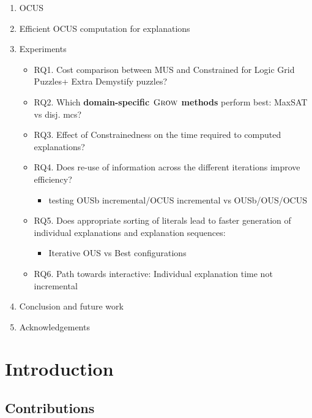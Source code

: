 \documentclass[twoside,11pt]{article}
\newcommand\mm[1]{\ensuremath{#1}\xspace}
\newcommand\call[1]{\mm{\textsc{#1}}}
\newcommand\grow{\mm{\call{Grow}}}
\begin{document}
\begin{enumerate}
\begin{itemize}
		  \item Calls to OCUS very similar (incrementality/better search)	
	  \end{itemize}
\item OCUS
\item Efficient OCUS computation for explanations
\item Experiments
	  \begin{itemize}
		  \item RQ1. Cost comparison between MUS and Constrained for Logic Grid Puzzles+ Extra Demystify puzzles?
		  \item RQ2. Which \textbf{domain-specific \grow methods} perform best: MaxSAT vs disj. mcs?
		  \item RQ3. Effect of Constrainedness on the time required to computed explanations?
		  \item RQ4. Does re-use of information across the different iterations improve efficiency? 
				\begin{itemize}
					\item testing OUSb incremental/OCUS incremental vs OUSb/OUS/OCUS
				\end{itemize}
		  \item RQ5. Does appropriate sorting of literals lead to faster generation of individual explanations and explanation sequences:
				\begin{itemize}
					\item Iterative OUS vs Best configurations
				\end{itemize} 
		  \item RQ6. Path towards interactive: Individual explanation time not incremental
	  \end{itemize}
\item Conclusion and future work
\item Acknowledgements
\end{enumerate}

\section{Introduction}
\label{sec:introduction}

\subsection{Contributions}
\label{sec:introduction}
\end{document}
